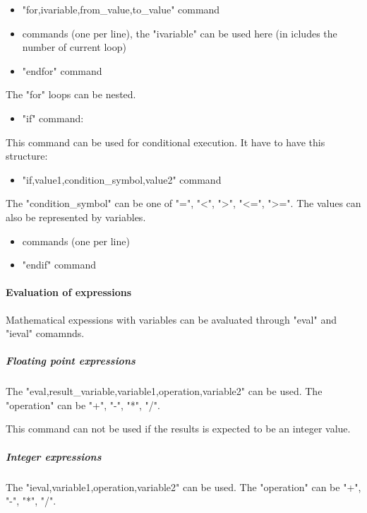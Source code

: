 \documentclass{article}
\begin{document}
\begin{itemize}
\item  "for,ivariable,from\_value,to\_value" command
\item  commands (one per line), the "ivariable" can be  used here (in icludes the number of current loop)

\item  "endfor" command
\end{itemize}

 The "for" loops can be nested.


\begin{itemize}
\item  "if" command:
\end{itemize}

 This command can be used for conditional execution.
 It have to have this structure:


\begin{itemize}
\item  "if,value1,condition\_symbol,value2" command
\end{itemize}

 The "condition\_symbol" can be one of "=",
 "<", ">", "<=", ">=". The values can also be
 represented by variables.


\begin{itemize}
\item  commands (one per line)
\item  "endif" command
\end{itemize}

\paragraph{Evaluation of expressions}

 Mathematical expessions with variables can be avaluated
 through "eval" and "ieval" comamnds.



\subparagraph{Floating point expressions}

 The "eval,result\_variable,variable1,operation,variable2" can be
 used. The "operation" can be "+", "-", "*", "/".

 This command can not be used if the results is
 expected to be an integer value.



\subparagraph{Integer expressions}

 The "ieval,variable1,operation,variable2" can be
 used. The "operation" can be "+", "-", "*", "/".
\end{document}
